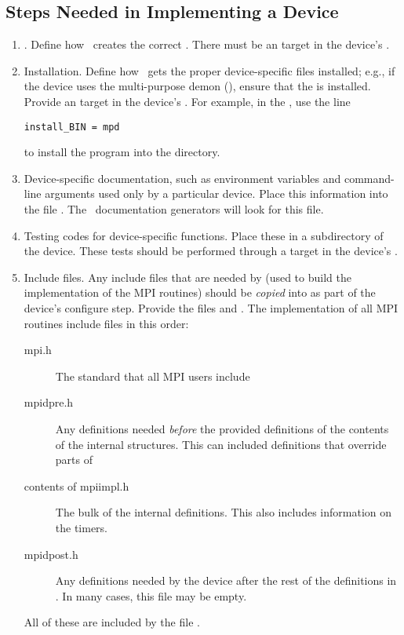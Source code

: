 \subsection{Steps Needed in Implementing a Device}
\begin{enumerate}
\item {}.  Define how \mpich\ creates the correct
.  There must be an  target in the
device's .

\item Installation.  Define how \mpich\ gets the proper device-specific files
  installed; e.g., if the device uses the multi-purpose demon
  (), ensure that the  is installed.  Provide an
   target in the device's .  For example,
  in the , use the line
\begin{verbatim}
install_BIN = mpd
\end{verbatim}
to install the program  into the  directory.

\item Device-specific documentation, such as environment variables and
  command-line arguments used only by a particular device.  Place this
  information into the file .  The \mpich\
  documentation generators will look for this file.

\item Testing codes for device-specific functions.  Place these
in a  subdirectory of the device. These tests 
should be performed through a  target in the device's
\file{Makefile}. 

\item Include files.  Any include files that are needed by
 (used to build the implementation of the MPI
routines) should be \emph{copied} into  as
part of the device's configure step.  Provide the files
 and .  The implementation of all MPI
routines include files in this order:
\begin{description}
\item[mpi.h]The standard  that all MPI users include
\item[mpidpre.h]Any definitions needed \emph{before} the provided
definitions of the contents of the internal structures.  This can
included definitions that override parts of \file{mpiimpl.h}
\item[contents of mpiimpl.h]The bulk of the internal definitions.
This also includes information on the timers.
\item[mpidpost.h]Any definitions needed by the device after the rest
of the definitions in \file{mpiimpl.h}.  In many cases, this file may
be empty.
\end{description}
All of these are included by the file .
\end{enumerate}

